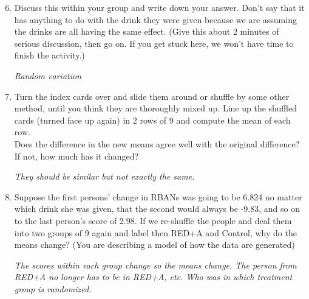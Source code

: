 \begin{enumerate}
  \setcounter{enumi}{5}
\item 
   Discuss this within your group and write down your answer.
  Don't say that it has anything to do with the drink they were given
  because we are assuming the drinks are all having the same effect. 
  (Give this about 2 minutes of serious discussion, then go on.
   If you get stuck here, we  won't have time to finish the activity.)
\begin{students}
    \vspace{7cm}    
\end{students}

\begin{key}
  {\it   Random variation}
\end{key}

\item  Turn the index cards over and slide them around or shuffle by
  some other method, until you think they are thoroughly mixed up.
  Line up the shuffled cards (turned face up again) in 2 rows of 9 and
  compute the mean of each row. 
  \vspace{1cm} \\

  Does the difference in the new means agree well with the original
  difference?   If not,  how much has it changed? 
\begin{students}
    \vspace{3cm}    
\end{students}

\begin{key}
  {\it  They should be similar but not exactly the same.}
\end{key}


\item  Suppose the first persons' change in RBANs was going to be
  6.824 no matter which drink she was given, that the second would
  always be -9.83, and so on to the last person's score of 2.98.  If
  we re-shuffle the people and deal them into two groups of 9 again
  and label then  RED+A and Control, why do the means change? (You
  are describing a model of how the data are generated) 
\begin{students}
    \vspace{5cm}    
\end{students}

\begin{key}
  {\it     The scores within each group change so the means change.  The person
  from RED+A no longer has to be in RED+A, etc.  Who was in which
  treatment group is randomized. 
}
\end{key}



\end{enumerate}
